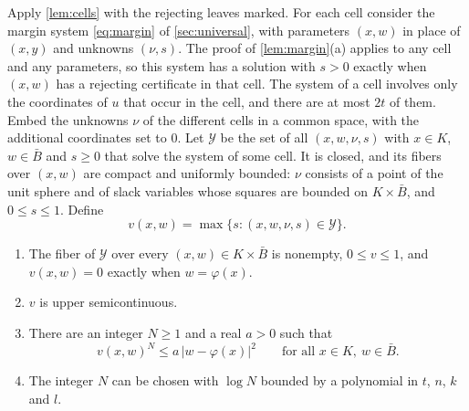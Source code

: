 Apply \cref{lem:cells} with the rejecting leaves marked. For each cell consider the margin system \eqref{eq:margin} of \cref{sec:universal}, with parameters $(x,w)$ in place of $(x,y)$ and unknowns $(\nu,s)$. The proof of \cref{lem:margin}(a) applies to any cell and any parameters, so this system has a solution with $s>0$ exactly when $(x,w)$ has a rejecting certificate in that cell. The system of a cell involves only the coordinates of $u$ that occur in the cell, and there are at most $2t$ of them. Embed the unknowns $\nu$ of the different cells in a common space, with the additional coordinates set to $0$. Let $\mathcal Y$ be the set of all $(x,w,\nu,s)$ with $x\in K$, $w\in\bar B$ and $s\ge0$ that solve the system of some cell. It is closed, and its fibers over $(x,w)$ are compact and uniformly bounded: $\nu$ consists of a point of the unit sphere and of slack variables whose squares are bounded on $K\times\bar B$, and $0\le s\le1$. Define
\[
v(x,w)=\max\{s:(x,w,\nu,s)\in\mathcal Y\}.
\]

\begin{lemma}\label{lem:flatten}
\begin{enumerate}[label=\textup{(\alph*)}]
\item The fiber of $\mathcal Y$ over every $(x,w)\in K\times\bar B$ is nonempty, $0\le v\le1$, and $v(x,w)=0$ exactly when $w=\varphi(x)$.
\item $v$ is upper semicontinuous.
\item There are an integer $N\ge1$ and a real $a>0$ such that
\[
v(x,w)^N\le a\,|w-\varphi(x)|^2\qquad\text{for all }x\in K,\ w\in\bar B .
\]
\item The integer $N$ can be chosen with $\log N$ bounded by a polynomial in $t$, $n$, $k$ and $l$.
\end{enumerate}
\end{lemma}

